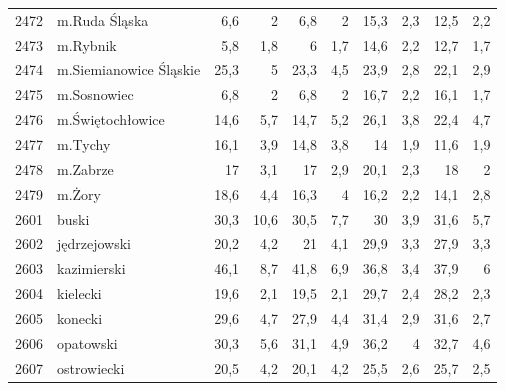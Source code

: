 \begin{center}
\begin{longtable}{lp{3cm}rrrrrrrr}
2472 & m.Ruda Śląska           & 6,6     & 2           & 6,8      & 2            & 15,3     & 2,3          & 12,5     & 2,2          \\
2473 & m.Rybnik                & 5,8     & 1,8         & 6        & 1,7          & 14,6     & 2,2          & 12,7     & 1,7          \\
2474 & m.Siemianowice Śląskie  & 25,3    & 5           & 23,3     & 4,5          & 23,9     & 2,8          & 22,1     & 2,9          \\
2475 & m.Sosnowiec             & 6,8     & 2           & 6,8      & 2            & 16,7     & 2,2          & 16,1     & 1,7          \\
2476 & m.Świętochłowice        & 14,6    & 5,7         & 14,7     & 5,2          & 26,1     & 3,8          & 22,4     & 4,7          \\
2477 & m.Tychy                 & 16,1    & 3,9         & 14,8     & 3,8          & 14       & 1,9          & 11,6     & 1,9          \\
2478 & m.Zabrze                & 17      & 3,1         & 17       & 2,9          & 20,1     & 2,3          & 18       & 2            \\
2479 & m.Żory                  & 18,6    & 4,4         & 16,3     & 4            & 16,2     & 2,2          & 14,1     & 2,8          \\
2601 & buski                   & 30,3    & 10,6        & 30,5     & 7,7          & 30       & 3,9          & 31,6     & 5,7          \\
2602 & jędrzejowski            & 20,2    & 4,2         & 21       & 4,1          & 29,9     & 3,3          & 27,9     & 3,3          \\
2603 & kazimierski             & 46,1    & 8,7         & 41,8     & 6,9          & 36,8     & 3,4          & 37,9     & 6            \\
2604 & kielecki                & 19,6    & 2,1         & 19,5     & 2,1          & 29,7     & 2,4          & 28,2     & 2,3          \\
2605 & konecki                 & 29,6    & 4,7         & 27,9     & 4,4          & 31,4     & 2,9          & 31,6     & 2,7          \\
2606 & opatowski               & 30,3    & 5,6         & 31,1     & 4,9          & 36,2     & 4            & 32,7     & 4,6          \\
2607 & ostrowiecki             & 20,5    & 4,2         & 20,1     & 4,2          & 25,5     & 2,6          & 25,7     & 2,5          \\

\end{longtable}
\end{center}
